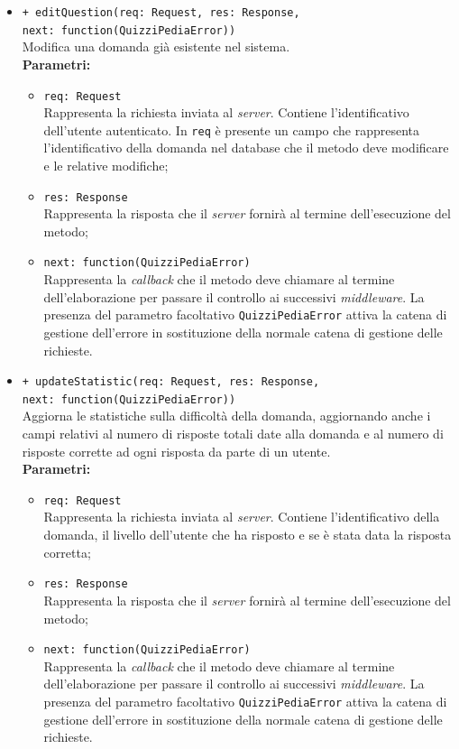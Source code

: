 \begin{itemize}
\begin{itemize}
				\item \texttt{+ editQuestion(req: Request, res: Response,\\ next: function(QuizziPediaError))} \\
				Modifica una domanda già esistente nel sistema. \\
				\textbf{Parametri:}
					\begin{itemize}
						\item \texttt{req: Request} \\
						Rappresenta la richiesta inviata al \textit{server}. Contiene l'identificativo dell'utente autenticato. In \texttt{req} è presente un campo che rappresenta l'identificativo della domanda nel database che il metodo deve modificare e le relative modifiche;
						\item \texttt{res: Response} \\
						Rappresenta la risposta che il \textit{server} fornirà al termine dell'esecuzione del metodo;
						\item \texttt{next: function(QuizziPediaError)} \\
						Rappresenta la \textit{callback} che il metodo deve chiamare al termine dell'elaborazione per passare il controllo ai successivi \textit{middleware}. La presenza del parametro facoltativo \texttt{QuizziPediaError} attiva la catena di gestione dell'errore in sostituzione della normale catena di gestione delle richieste.
					\end{itemize}
					
				\item \texttt{+ updateStatistic(req: Request, res: Response,\\ next: function(QuizziPediaError))} \\
				Aggiorna le statistiche sulla difficoltà della domanda, aggiornando anche i campi relativi al numero di risposte totali date alla domanda e al numero di risposte corrette ad ogni risposta da parte di un utente. \\
				\textbf{Parametri:}
					\begin{itemize}
						\item \texttt{req: Request} \\
						Rappresenta la richiesta inviata al \textit{server}. Contiene l'identificativo della domanda, il livello dell'utente che ha risposto e se è stata data la risposta corretta;
						\item \texttt{res: Response} \\
						Rappresenta la risposta che il \textit{server} fornirà al termine dell'esecuzione del metodo;
						\item \texttt{next: function(QuizziPediaError)} \\
						Rappresenta la \textit{callback} che il metodo deve chiamare al termine dell'elaborazione per passare il controllo ai successivi \textit{middleware}. La presenza del parametro facoltativo \texttt{QuizziPediaError} attiva la catena di gestione dell'errore in sostituzione della normale catena di gestione delle richieste.
					\end{itemize}
					

\end{itemize}
\end{itemize}

